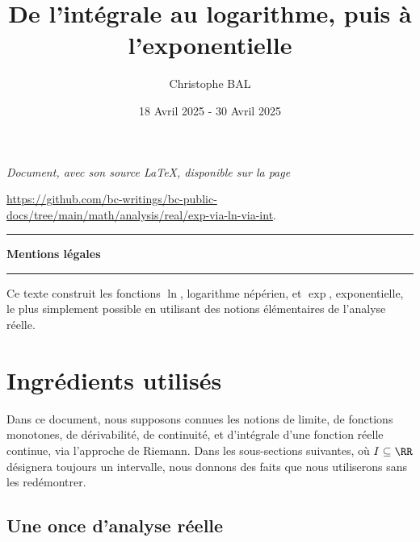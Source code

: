 \documentclass[12pt]{amsart}
\begin{document}
\title{De l'intégrale au logarithme, puis à l'exponentielle}
\author{Christophe BAL}
\date{18 Avril 2025 - 30 Avril 2025}

\maketitle

\begin{center}
    \itshape
    Document, avec son source \LaTeX, disponible sur la page

    \url{https://github.com/bc-writings/bc-public-docs/tree/main/math/analysis/real/exp-via-ln-via-int}.
\end{center}


\bigskip


\begin{center}
    \hrule\vspace{.3em}
    {
        \fontsize{1.35em}{1em}\selectfont
        \textbf{Mentions \og légales \fg}
    }

    \vspace{0.45em}
    \doclicenseThis
    \hrule
\end{center}


\bigskip


\setcounter{tocdepth}{2}
\tableofcontents




\newpage

\begin{meta-abstract*}
    Ce texte construit les fonctions $\ln$, logarithme népérien, et $\exp$, exponentielle, le plus simplement possible en utilisant des notions élémentaires de l'analyse réelle.
\end{meta-abstract*}




\section{Ingrédients utilisés}

Dans ce document,
nous supposons connues les notions
de limite,
de fonctions monotones,
de dérivabilité,
de continuité,
et
d'intégrale d'une fonction réelle continue, via l'approche de Riemann.
%
Dans les sous-sections suivantes, où $I \subseteq \RR$ désignera toujours un intervalle, nous donnons des faits que nous utiliserons sans les redémontrer.


    \subsection{Une once d'analyse réelle}
\end{document}
